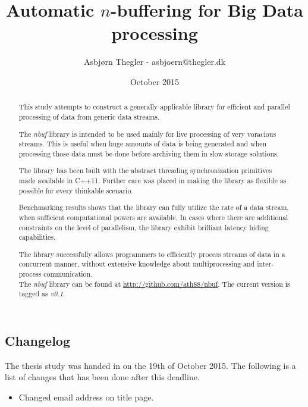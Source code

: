 \documentclass[a4paper]{article}
\title{Automatic $n$-buffering for Big Data processing}
\author{Asbj\o rn Thegler - asbjoern@thegler.dk}
\date{October 2015}
\newcommand{\nbuf}{\textit{nbuf} }
\begin{document}
\maketitle

\sloppy

\begin{abstract}
\begin{doublespace}
This study attempts to construct a generally applicable library for efficient and parallel processing of data from generic data streams.

The \nbuf library is intended to be used mainly for live processing of very voracious streams. This is useful when huge amounts of data is being generated and when processing those data must be done before archiving them in slow storage solutions.

The library has been built with the abstract threading synchronization primitives made available in C++11. Further care was placed in making the library as flexible as possible for every thinkable scenario.

Benchmarking results shows that the library can fully utilize the rate of a data stream, when sufficient computational powers are available. In cases where there are additional constraints on the level of parallelism, the library exhibit brilliant latency hiding capabilities.

The library successfully allows programmers to efficiently process streams of data in a concurrent manner, without extensive knowledge about multiprocessing and inter-process communication.\\

The \nbuf library can be found at \url{http://github.com/ath88/nbuf}. The current version is tagged as \textit{v0.1}.

\end{doublespace}
\end{abstract}


\subsection*{Changelog}
The thesis study was handed in on the 19th of October 2015. The following is a list of changes that has been done after this deadline.

\begin{itemize}
\item Changed email address on title page.
\end{itemize}
\end{document}
